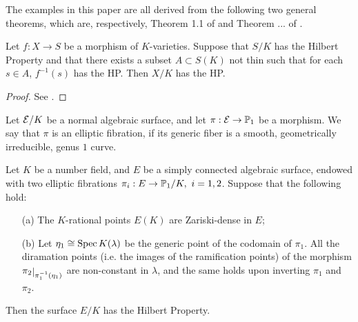 \documentclass[a4paper,12pt]{article}
\begin{document}
The examples in this paper are all derived from the following two general theorems, which are, respectively, Theorem 1.1 of \cite{fibrazioniHP} and Theorem ... of \cite{myarticle1}.

\begin{theorem}\label{fibrationHP}
	Let $f:X \rightarrow S$ be a morphism of $K$-varieties. Suppose that $S/K$ has the Hilbert Property and that there exists a subset $A \subset S(K)$ not thin such that for each $s \in A$, $f^{-1}(s)$ has the HP. Then $X/K$ has the HP.
\end{theorem}
\begin{proof}
	See \cite[Theorem 1.1]{fibrazioniHP}.
\end{proof}

\begin{definition}\label{ellipticfibration}
	Let $\mathcal{E}/K$ be a normal algebraic surface, and let $\pi:\mathcal{E} \rightarrow \mathbb{P}_1$ be a morphism. We say that $\pi$ is an elliptic fibration, if its generic fiber is a smooth, geometrically irreducible, genus $1$ curve.
\end{definition}

\begin{theorem}\label{mydoublefibration}
	Let $K$ be a number field, and $E$ be a simply connected algebraic surface, endowed with two elliptic fibrations $\pi_i:E \rightarrow \P_1/K, \ i=1,2$. Suppose that the following hold:
	\begin{itemize}
		\item[(a)] The $K$-rational points $E(K)$ are Zariski-dense in $E$;
		\item[(b)] Let $\eta_1 \cong \operatorname{Spec} K(\lambda)$ be the generic point of the codomain of $\pi_1$. All the diramation points (i.e. the images of the ramification points) of the morphism $\restricts{\pi_2}{\pi_1^{-1}(\eta_1)}$ are non-constant in $\lambda$, and the same holds upon inverting $\pi_1$ and $\pi_2$.
	\end{itemize}
	Then the surface $E/K$ has the Hilbert Property.
\end{theorem}
\end{document}
